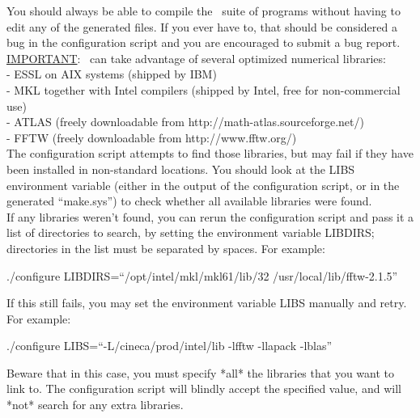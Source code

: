 \noindent You should always be able to compile the \WANT\ suite of
programs without having to edit any of the generated files.  If
you ever have to, that should be considered a bug in the
configuration script and you are encouraged to submit a bug
report.\\

\noindent \underline {IMPORTANT}: \WANT\ can take advantage of
several
optimized numerical libraries:\\
\noindent - ESSL on AIX systems (shipped by IBM)\\
\noindent - MKL together with Intel compilers (shipped by Intel,
free for non-commercial use)\\
\noindent  - ATLAS (freely downloadable from
http://math-atlas.sourceforge.net/)\\
\noindent  - FFTW (freely downloadable from
http://www.fftw.org/)\\

\noindent The configuration script attempts to find those
libraries, but may fail if they have been installed in
non-standard locations. You should look at the LIBS environment
variable (either in the output of the configuration script, or in
the generated ``make.sys'') to check whether all available
libraries were found.\\

\noindent If any libraries weren't found, you can rerun the
configuration script and pass it a list of directories to search,
by setting the environment variable LIBDIRS; directories in the
list must be
separated by spaces.  For example:\\

\begin{description}
  \item ./configure LIBDIRS=``/opt/intel/mkl/mkl61/lib/32
  /usr/local/lib/fftw-2.1.5''
\end{description}

\noindent If this still fails, you may set the environment
variable LIBS manually and retry.  For example:\\

\begin{description}
  \item ./configure LIBS=``-L/cineca/prod/intel/lib -lfftw -llapack
  -lblas''
\end{description}

\noindent Beware that in this case, you must specify *all* the
libraries that you want to link to.  The configuration script will
blindly accept the specified value, and will *not* search for any
extra libraries.\\

